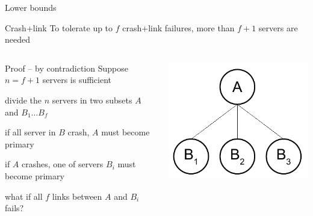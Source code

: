 \begin{frame}{Lower bounds}
	
\begin{block}{Crash+link}
To tolerate up to $f$ crash+link failures, more than $f+1$ servers are
needed
\end{block}

\begin{columns}
\begin{column}{0.6\textwidth}
\begin{block}{Proof -- by contradiction}
Suppose $n=f+1$ servers is sufficient
\BI
\item divide the $n$ servers in two subsets $A$ and $B_1 \ldots B_f$
\item if all server in $B$ crash, $A$ must become primary
\item if $A$ crashes, one of servers $B_i$ must become primary
\item what if all $f$ links between $A$ and $B_i$ fails?
\EI
\end{block}
\end{column}
\hfill
\begin{column}{0.30\textwidth}
\includegraphics[width=\textwidth]{figs/09/lowerbound}
\end{column}
\end{columns}

\end{frame}

